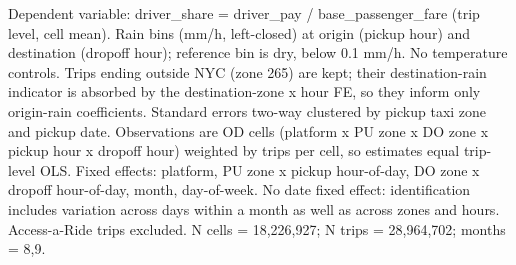 \par \raggedright 
Dependent variable: driver\_share = driver\_pay / base\_passenger\_fare (trip level, cell mean). Rain bins (mm/h, left-closed) at origin (pickup hour) and destination (dropoff hour); reference bin is dry, below 0.1 mm/h. No temperature controls. Trips ending outside NYC (zone 265) are kept; their destination-rain indicator is absorbed by the destination-zone x hour FE, so they inform only origin-rain coefficients. Standard errors two-way clustered by pickup taxi zone and pickup date. Observations are OD cells (platform x PU zone x DO zone x pickup hour x dropoff hour) weighted by trips per cell, so estimates equal trip-level OLS. Fixed effects: platform, PU zone x pickup hour-of-day, DO zone x dropoff hour-of-day, month, day-of-week. No date fixed effect: identification includes variation across days within a month as well as across zones and hours. Access-a-Ride trips excluded. N cells = 18,226,927; N trips = 28,964,702; months = 8,9.
\par\endgroup


\ifdefined\ifclassloaded
{}
\fi
